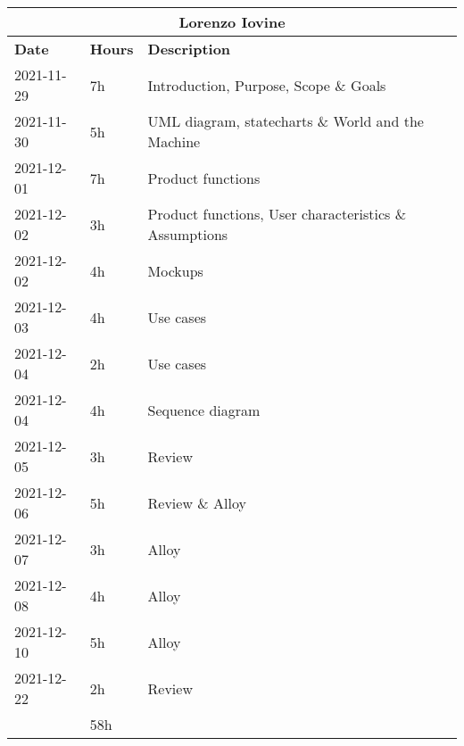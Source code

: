 \begin{table}[H]
    \centering
    \begin{tabular}{|l|l|l|}
        \multicolumn{3}{c}{\textbf{Lorenzo Iovine}}                   \\
        \hline
        \textbf{Date} & \textbf{Hours} & \textbf{Description}          \\\hline
        2021-11-29    & 7h             & Introduction, Purpose, Scope \& Goals                  \\\hline
        2021-11-30    & 5h             & UML diagram, statecharts \& World and the Machine      \\\hline
        2021-12-01    & 7h             & Product functions                                      \\\hline
        2021-12-02    & 3h             & Product functions, User characteristics \& Assumptions \\\hline
        2021-12-02    & 4h             & Mockups                                                \\\hline
        2021-12-03    & 4h             & Use cases                                              \\\hline
        2021-12-04    & 2h             & Use cases                                              \\\hline
        2021-12-04    & 4h             & Sequence diagram                                       \\\hline
        2021-12-05    & 3h             & Review                                                 \\\hline
        2021-12-06    & 5h             & Review \& Alloy                                        \\\hline
        2021-12-07    & 3h             & Alloy                                                  \\\hline
        2021-12-08    & 4h             & Alloy                                                  \\\hline
        2021-12-10    & 5h             & Alloy                                                  \\\hline
        2021-12-22    & 2h             & Review                                                 \\\hline\hline
                      & 58h            &                                                        \\\hline
    \end{tabular}
\end{table}
